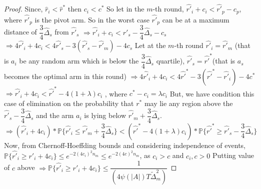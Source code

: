 \begin{proof}
Since, $\hat{r}_{i}< \hat{r}^{*}$ then $c_{i}<c^{*}$
\newline
So let in the $m$-th round, 
\newline
\hspace*{8em}$\hat{r'}_{i}+c_{i} < \hat{r'}_{p}-c_{p}$, where $\hat{r'}_{p}$ is the pivot arm. So in the worst case $\hat{r'}_{p}$ can be at a maximum distance of $\dfrac{3}{4}\hat{\Delta}_{s}$ from $\hat{r'}_{s}$ 
\newline \hspace*{8em}$\Rightarrow \hat{r'}_{i} + c_{i} <  \hat{r'}_{s} - \dfrac{3}{4}\hat{\Delta}_{s} - c_{s}$
\newline \hspace*{8em}$\Rightarrow 4\hat{r'}_{i} + 4c_{i} < 4\hat{r'}_{s} - 3(\hat{r'}_{s}-\hat{r'}_{m}) - 4c_{s}$
\newline Let at the $m$-th round $\hat{r'}_{i}=\hat{r'}_{m}$ (that is $a_{i}$ be any random arm which is below the $\dfrac{3}{4}\hat{\Delta}_{s}$ quartile), $\hat{r'}_{s}=\hat{r'}^{*}$(that is $a_{s}$ becomes the optimal arm in this round)
\newline \hspace*{8em}$\Rightarrow 4\hat{r'}_{i} + 4c_{i} < 4\hat{r'}^{*} - 3(\hat{r'}^{*}-\hat{r'}_{i}) - 4c^{*}$
\newline \hspace*{8em}$\Rightarrow \hat{r'}_{i} + 4c_{i} < \hat{r'}^{*} - 4(1+\lambda)c_{i}$ , where $c^{*}-c_{i}=\lambda c_{i}$
\newline
But, we have condition this case of elimination on the probability that $r^{*}$ may lie any region above the $\hat{r'}_{s}-\dfrac{3}{4}\hat{\Delta}_{s}$ and the arm $a_{i}$ is lying below $\hat{r'}_{m}+\dfrac{3}{4}\hat{\Delta}_{s}$.
\newline
\hspace*{8em}$\Rightarrow (\hat{r'}_{i} + 4c_{i})*\mathbb{P}\lbrace \hat{r'}_{i} \leq \hat{r'}_{m} + \dfrac{3}{4}\hat{\Delta}_{s}\rbrace < (\hat{r'}^{*} - 4(1+\lambda)c_{i})*\mathbb{P}\lbrace \hat{r'}^{*} \geq \hat{r'}_{s} - \dfrac{3}{4}\hat{\Delta}_{s} \rbrace$
\newline
Now, from Chernoff-Hoeffding bounds and considering independence of events,
\newline 
\hspace*{8em}$\mathbb{P}\lbrace\hat{r'}_{i} \geq r'_{i} + 4c_{i}\rbrace \leq e^{-2(4c_{i})^{2}n_{m}} \leq e^{-2(4c)^{2}n_{m}}$, as $c_{i} > c$ and $c_{i},c>0$
\newline Putting value of $c$ above
\newline\hspace*{8em} $\Rightarrow \mathbb{P} \lbrace  \hat{r'}_{i} \geq r'_{i} + 4c_{i} \rbrace \leq \dfrac{1}{(4\psi(|A|)T\tilde{\Delta}_{m}^{2})}$

\end{proof}
